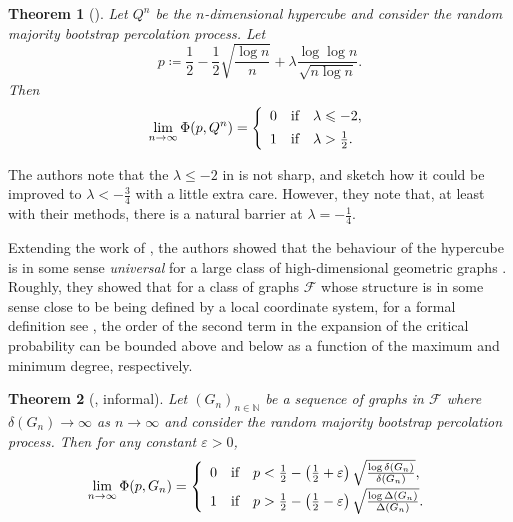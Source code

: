 \documentclass[reqno,a4paper,11pt]{amsart}
\newtheorem{theorem}{Theorem}[section]
\theoremstyle{definition}
\renewcommand{\leq}{\leqslant}
\newcommand{\eps}{\varepsilon}
\begin{document}
\begin{theorem}[{\cite[Theorem 2.1]{BaBoMo2009}}]\label{thm:BaBoMohypercube}
  Let $Q^n$ be the $n$-dimensional hypercube and consider the random majority bootstrap percolation process. Let
  \[
    p\coloneqq\frac{1}{2}-\frac{1}{2} \sqrt{\frac{\log n}{n}} + \lambda \frac{\log \log n}{\sqrt{n \log n}}.
  \]
  Then
  \[
    \lim_{n \to \infty} \Phi(p, Q^n) = \left\{
      \begin{array} {c@{\quad \textup{if} \quad}l}
        0 & \lambda \leq -2,       \\[+1ex]
        1 & \lambda > \frac{1}{2}.
      \end{array}\right.
  \]
\end{theorem}

The authors note \cite[Section 5]{BaBoMo2009} that the $\lambda \leq -2$ in  is not sharp, and sketch how it could be improved to $\lambda < -\frac{3}{4}$ with a little extra care.
However, they note that, at least with their methods, there is a natural barrier at $\lambda = -\frac{1}{4}$.

Extending the work of \cite{BaBoMo2009}, the authors showed that the behaviour of the hypercube is in some sense \emph{universal} for a large class of high-dimensional geometric graphs \cite{CEGK24}.
Roughly, they showed that for a class of graphs $\mathcal{F}$ whose structure is in some sense close to be being defined by a local coordinate system, for a formal definition see , the order of the second term in the expansion of the critical probability can be bounded above and below as a function of the maximum and minimum degree, respectively.

\begin{theorem}[{\cite[Theorem 1.4]{CEGK24}, informal}]\label{t:mainThm-classH}
  Let $(G_n)_{n \in \mathbb{N}}$ be a sequence of graphs in $\mathcal{F}$ where $\delta(G_n) \to \infty$ as $n \to \infty$ and consider the random majority bootstrap percolation process.
  Then for any constant $\eps > 0$,
  \[
    \lim_{n \to \infty} \Phi(p, G_n) = \left\{
      \begin{array} {c@{\quad \textup{if} \quad}l}
        0 & p < \frac{1}{2}-\left(\frac{1}{2}+\eps\right) \sqrt{\frac{\log \delta(G_n)}{\delta(G_n)}}, \\[+1ex]
        1 & p > \frac{1}{2}-\left(\frac{1}{2}-\eps\right) \sqrt{\frac{\log \Delta(G_n)}{\Delta(G_n)}}.
      \end{array}\right.
  \]
\end{theorem}
\end{document}
